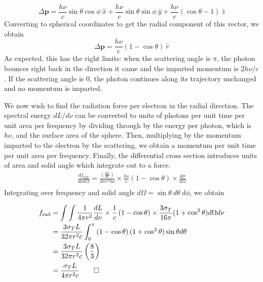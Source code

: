 \documentclass{article}
\begin{document}
\begin{equation}
    \Delta \mathbf{p} = \frac{h\nu}{c}\sin \theta \cos \phi\ \hat{x} + \frac{h\nu}{c}\sin \theta \sin \phi\ \hat{y} + \frac{h\nu}{c}\left(\cos \theta - 1\right)\ \hat{z}
\end{equation}
%
Converting to spherical coordinates to get the radial component of this vector, we obtain
\begin{equation}
    \boxed{\Delta \mathbf{p} = \frac{h\nu}{c}\left(1-\cos\theta\right)\ \hat{r}}
\end{equation}
As expected, this has the right limits: when the scattering angle is $\pi$, the photon bounces right back in the direction it came and the imparted momentum is $2h\nu/c$. If the scattering angle is $0$, the photon continues along its trajectory unchanged and no momentum is imparted. 

We now wish to find the radiation force per electron in the radial direction. The spectral energy $dL/d\nu$ can be converted to units of photons per unit time per unit area per frequency by dividing through by the energy per photon, which is $h\nu$, and the surface area of the sphere. Then, multiplying by the momentum imparted to the electron by the scattering, we obtain a momentum per unit time per unit area per frequency. Finally, the differential cross section introduces units of area and solid angle which integrate out to a force.
%
\begin{equation}
    \begin{split}
    \frac{df_{\mathrm{rad}}}{d\nu d\Omega} = \frac{\left(\frac{dL}{d\nu}\right)}{4\pi r^2 h\nu}\times \frac{h\nu}{c}\left(1 - \cos \theta \right) \times \frac{d\sigma}{d\Omega} \\
    \end{split}
\end{equation}
%
Integrating over frequency and solid angle $d\Omega = \sin \theta \ d\theta\ d\phi$, we obtain

\begin{equation*}
    \begin{split}
    f_{\mathrm{rad}} &= \int
\int\frac{1}{4\pi r^2}\frac{dL}{d\nu}\times \frac{1}{c}\left(1 - \cos \theta \right) \times \frac{3 \sigma_T}{16\pi}(1 + \cos^2 \theta) d\Omega d\nu\\
%
&= \frac{3 \sigma_T L}{32\pi r^2 c} \int_0^\pi \left(1 - \cos \theta \right)(1 + \cos^2 \theta) \sin \theta d\theta\\
&= \frac{3 \sigma_T L}{32\pi r^2 c} \left(\frac{8}{3}\right)\\
&= \frac{\sigma_T L}{4\pi r^2 c} \qed
    \end{split}
\end{equation*}
\end{document}
